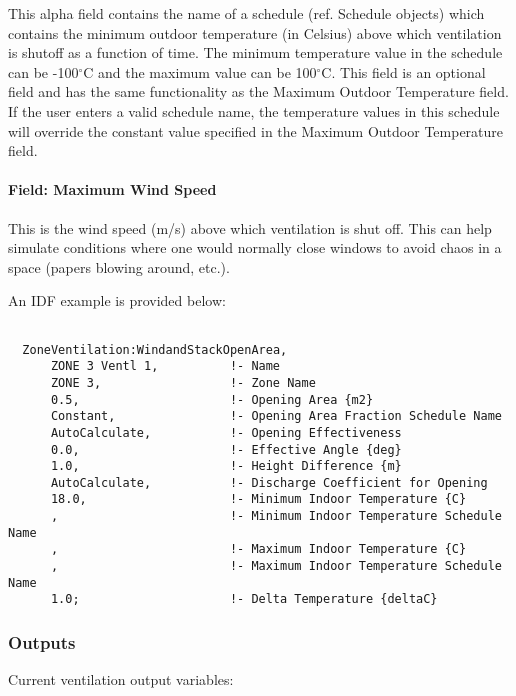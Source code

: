 This alpha field contains the name of a schedule (ref. Schedule objects) which contains the minimum outdoor temperature (in Celsius) above which ventilation is shutoff as a function of time. The minimum temperature value in the schedule can be -100$^\circ$C and the maximum value can be 100$^\circ$C. This field is an optional field and has the same functionality as the Maximum Outdoor Temperature field. If the user enters a valid schedule name, the temperature values in this schedule will override the constant value specified in the Maximum Outdoor Temperature field.

\paragraph{Field: Maximum Wind Speed}\label{field-maximum-wind-speed-1}

This is the wind speed (m/s) above which ventilation is shut off. This can help simulate conditions where one would normally close windows to avoid chaos in a space (papers blowing around, etc.).

An IDF example is provided below:

\begin{lstlisting}

  ZoneVentilation:WindandStackOpenArea,
      ZONE 3 Ventl 1,          !- Name
      ZONE 3,                  !- Zone Name
      0.5,                     !- Opening Area {m2}
      Constant,                !- Opening Area Fraction Schedule Name
      AutoCalculate,           !- Opening Effectiveness
      0.0,                     !- Effective Angle {deg}
      1.0,                     !- Height Difference {m}
      AutoCalculate,           !- Discharge Coefficient for Opening
      18.0,                    !- Minimum Indoor Temperature {C}
      ,                        !- Minimum Indoor Temperature Schedule Name
      ,                        !- Maximum Indoor Temperature {C}
      ,                        !- Maximum Indoor Temperature Schedule Name
      1.0;                     !- Delta Temperature {deltaC}
\end{lstlisting}

\subsubsection{Outputs}\label{outputs-1-002}

Current ventilation output variables:

